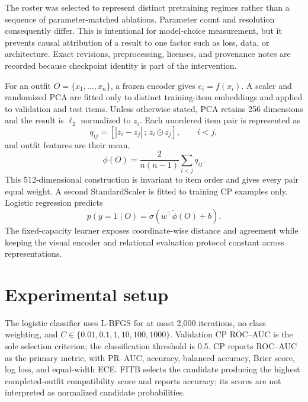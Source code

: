 \documentclass[pdflatex,sn-mathphys-num,iicol]{sn-jnl}
\begin{document}
The roster was selected to represent distinct pretraining regimes rather than a sequence of parameter-matched ablations. Parameter count and resolution consequently differ. This is intentional for model-choice measurement, but it prevents causal attribution of a result to one factor such as loss, data, or architecture. Exact revisions, preprocessing, licenses, and provenance notes are recorded because checkpoint identity is part of the intervention.

For an outfit $O=\{x_1,\ldots,x_n\}$, a frozen encoder gives $e_i=f(x_i)$. A scaler and randomized PCA are fitted only to distinct training-item embeddings and applied to validation and test items. Unless otherwise stated, PCA retains 256 dimensions and the result is $\ell_2$ normalized to $z_i$. Each unordered item pair is represented as
\begin{equation}
q_{ij}=\left[|z_i-z_j|\,;\, z_i\odot z_j\right], \qquad i<j,
\label{eq:pair}
\end{equation}
and outfit features are their mean,
\begin{equation}
\phi(O)=\frac{2}{n(n-1)}\sum_{i<j}q_{ij}.
\label{eq:outfit}
\end{equation}
This 512-dimensional construction is invariant to item order and gives every pair equal weight. A second StandardScaler is fitted to training CP examples only. Logistic regression predicts
\begin{equation}
p(y=1\mid O)=\sigma(w^{\top}\tilde\phi(O)+b).
\end{equation}
The fixed-capacity learner exposes coordinate-wise distance and agreement while keeping the visual encoder and relational evaluation protocol constant across representations.

\section{Experimental setup}\label{sec:setup}

The logistic classifier uses L-BFGS for at most 2,000 iterations, no class weighting, and $C\in\{0.01,0.1,1,10,100,1000\}$. Validation CP ROC--AUC is the sole selection criterion; the classification threshold is 0.5. CP reports ROC--AUC as the primary metric, with PR--AUC, accuracy, balanced accuracy, Brier score, log loss, and equal-width ECE. FITB selects the candidate producing the highest completed-outfit compatibility score and reports accuracy; its scores are not interpreted as normalized candidate probabilities.
\end{document}
